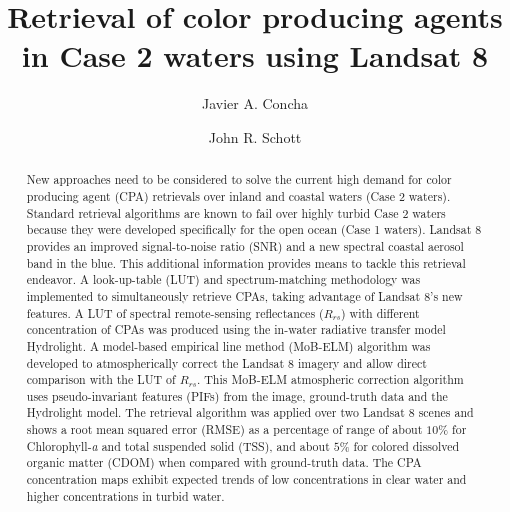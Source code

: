 \documentclass[onecolumn,3p,letterpaper]{elsarticle}
\begin{document}
\linenumbers

\begin{frontmatter}

\title{Retrieval of color producing agents in Case 2 waters using Landsat 8}


\author[mymainaddress]{Javier A. Concha}

\author[mymainaddress]{John R. Schott}
\address[mymainaddress]{Rochester Institute of Technology (RIT), NY 14623, USA}
\begin{abstract}

New approaches need to be considered to solve the current high demand for color producing agent (CPA) retrievals over inland and coastal waters (Case 2 waters). 
%
Standard retrieval algorithms are known to fail over highly turbid Case 2 waters because they were developed specifically for the open ocean (Case 1 waters). 
%
Landsat 8 provides an improved signal-to-noise ratio (SNR) and a new spectral coastal aerosol band in the blue. 
%
This additional information provides means to tackle this retrieval endeavor. 
A look-up-table (LUT) and spectrum-matching methodology was implemented to simultaneously retrieve CPAs, taking advantage of Landsat 8's new features. 
%
A LUT of spectral remote-sensing reflectances ($R_{rs}$) with different concentration of CPAs was produced using the in-water radiative transfer model Hydrolight. 
%
A model-based empirical line method (MoB-ELM) algorithm was developed to atmospherically correct the Landsat 8 imagery and allow direct comparison with the LUT of $R_{rs}$. 
%
This MoB-ELM atmospheric correction algorithm uses pseudo-invariant features (PIFs) from the image, ground-truth data and the Hydrolight model.
The retrieval algorithm was applied over two Landsat 8 scenes and shows a root mean squared error (RMSE) as a percentage of range of about $10\%$ for Chlorophyll-{\it a} and total suspended solid (TSS), and about $5\%$ for colored dissolved organic matter (CDOM) when compared with ground-truth data. The CPA concentration maps exhibit expected trends of low concentrations in clear water and higher concentrations in turbid water.


\end{abstract}
\end{frontmatter}
\end{document}
